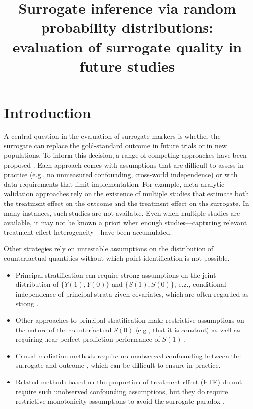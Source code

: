 \documentclass{article}
\title{Surrogate inference via random probability distributions: evaluation of surrogate quality in future studies}
\begin{document}
\maketitle

\section{Introduction}

A central question in the evaluation of surrogate markers is whether the surrogate can replace the gold-standard outcome in future trials or in new populations. To inform this decision, a range of competing approaches have been proposed \cite{joffe2009related}. Each approach comes with assumptions that are difficult to assess in practice (e.g., no unmeasured confounding, cross-world independence) or with data requirements that limit implementation. For example, meta-analytic validation approaches \cite{buyse2000validation} rely on the existence of multiple studies that estimate both the treatment effect on the outcome and the treatment effect on the surrogate. In many instances, such studies are not available. Even when multiple studies are available, it may not be known a priori when enough studies---capturing relevant treatment effect heterogeneity---have been accumulated. 

Other strategies rely on untestable assumptions on the distribution of counterfactual quantities without which point identification is not possible. 
\begin{itemize}
    \item Principal stratification can require strong assumptions on the joint distribution of $\{Y(1), Y(0)\}$ and $\{S(1), S(0)\}$, e.g., conditional independence of principal strata given covariates, which are often regarded as strong \cite{frangakis2002principal, kim2024bayesian}.
    \item Other approaches to principal stratification make restrictive assumptions on the nature of the counterfactual $S(0)$ (e.g., that it is constant) as well as requiring near-perfect prediction performance of $S(1)$ \cite{elliott2023surrogate}. 
    \item Causal mediation methods require no unobserved confounding between the surrogate and outcome \cite{vanderweele2015mediation}, which can be difficult to ensure in practice. 
    \item Related methods based on the proportion of treatment effect (PTE) do not require such unobserved confounding assumptions, but they do require restrictive monotonicity assumptions to avoid the surrogate paradox \cite{chen2003pte}.
\end{itemize}
\end{document}
